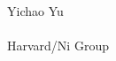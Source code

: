 \documentclass{beamer}
\begin{document}
\begin{frame}[t]{}
\begin{columns}[t]
{    }
    \column{4cm}
    \begin{center}
      {\large{Yichao Yu}}\\
      {\small{\@date}}\\
      {\small{Harvard/Ni Group}}
    \end{center}
  \end{columns}
\end{frame}
\makeatother



\end{document}
